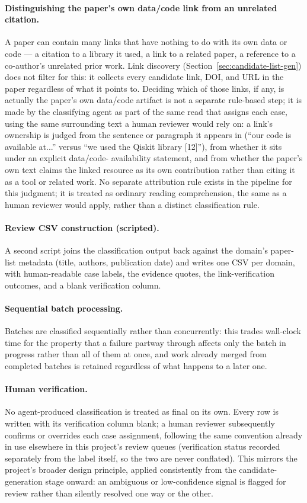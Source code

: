 \paragraph{Distinguishing the paper's own data/code link from an unrelated citation.}
A paper can contain many links that have nothing to do with its own data or code ---
a citation to a library it used, a link to a related paper, a reference to a
co-author's unrelated prior work. Link discovery (Section~\ref{sec:candidate-list-gen})
does not filter for this: it collects every candidate link, DOI, and URL in the paper
regardless of what it points to. Deciding which of those links, if any, is actually
the paper's own data/code artifact is not a separate rule-based step; it is made by
the classifying agent as part of the same read that assigns each case, using the same
surrounding text a human reviewer would rely on: a link's ownership is judged from the
sentence or paragraph it appears in (``our code is available at...'' versus ``we used
the Qiskit library [12]''), from whether it sits under an explicit data/code-
availability statement, and from whether the paper's own text claims the linked
resource as its own contribution rather than citing it as a tool or related work. No
separate attribution rule exists in the pipeline for this judgment; it is treated as
ordinary reading comprehension, the same as a human reviewer would apply, rather than
a distinct classification rule.

\paragraph{Review CSV construction (scripted).} A second script joins the
classification output back against the domain's paper-list metadata (title, authors,
publication date) and writes one CSV per domain, with human-readable case labels,
the evidence quotes, the link-verification outcomes, and a blank verification column.

\paragraph{Sequential batch processing.} Batches are classified sequentially rather
than concurrently: this trades wall-clock time for the property that a failure
partway through affects only the batch in progress rather than all of them at once,
and work already merged from completed batches is retained regardless of what happens
to a later one.

\paragraph{Human verification.} No agent-produced classification is treated as
final on its own. Every row is written with its verification column blank; a human
reviewer subsequently confirms or overrides each case assignment, following the same
convention already in use elsewhere in this project's review queues (verification
status recorded separately from the label itself, so the two are never conflated).
This mirrors the project's broader design principle, applied consistently from the
candidate-generation stage onward: an ambiguous or low-confidence signal is flagged for
review rather than silently resolved one way or the other.
